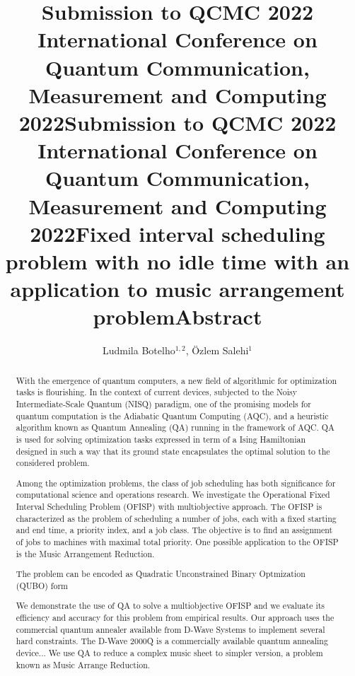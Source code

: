 \documentclass[aps,reprint]{revtex4-2}
\title@column %
\title{\normalsize Submission to QCMC 2022 \\ %
            International Conference on Quantum Communication,\\ 
            Measurement and Computing 2022}
\makeatletter
\newcommand{\printentry}{%
    \@author@finish%
    \title@column %
    \titleblock@produce %
    \suppressfloats[t] %
    \let\@AAC@list\@empty %
    \let\@AFF@list\@empty %
    \let\@AFG@list\@empty %
    \let\@address\@empty %
    \titlepage@sw %
    {\vfil\clearpage}%
}
\newcommand{\printheader}{%
    \title{\normalsize Submission to QCMC 2022 \\ %
            International Conference on Quantum Communication,\\ 
            Measurement and Computing 2022}
    \printentry
}
\makeatother
\begin{document}
\printheader



\title{Fixed interval scheduling problem with no idle time with an application to music arrangement problem} %
\author{Ludmila Botelho$^{1,2}$, \"Ozlem Salehi$^{1}$} %
{} %

\printentry
\title{\small Abstract}
\begin{abstract}
  
With the emergence of quantum computers, a new field of algorithmic for optimization tasks is flourishing. In the context of current devices, subjected to the Noisy Intermediate-Scale Quantum (NISQ) paradigm, one of the promising models for quantum computation is the Adiabatic Quantum Computing (AQC), and a heuristic algorithm known as Quantum Annealing (QA) running in the framework of AQC. QA is used for solving optimization tasks expressed in term of a Ising Hamiltonian designed in such a way that its ground state encapsulates the optimal solution to the considered problem. 

Among the optimization problems, the class of job scheduling has both significance for computational science and operations research. We investigate the Operational Fixed Interval Scheduling Problem (OFISP) with multiobjective approach. The OFISP is characterized as the problem of scheduling a number of jobs, each with a fixed starting and end time, a priority index, and a job class. The objective is to find an assignment of jobs to machines with maximal total priority. One possible application to the OFISP is the Music Arrangement Reduction. 

The problem can be encoded as Quadratic Unconstrained Binary Optmization (QUBO) form


We demonstrate the use of QA to solve a multiobjective OFISP and we evaluate its efficiency and accuracy for this problem from empirical results. Our approach uses the commercial quantum annealer available from D-Wave Systems to implement several hard constraints. The D-Wave 2000Q is a commercially available quantum annealing device... We use QA to reduce a complex music sheet to simpler version, a problem known as Music Arrange Reduction. 
\end{abstract}
\printentry
\end{document}
